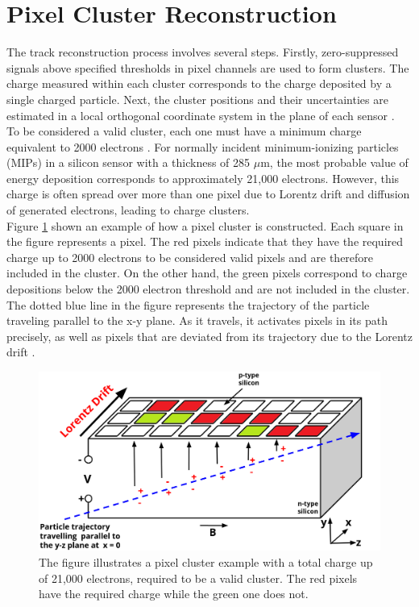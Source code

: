 \section{Pixel Cluster Reconstruction}

The track reconstruction process involves several steps. Firstly, zero-suppressed signals above specified thresholds in pixel  channels  are used to form clusters. The charge measured within each cluster corresponds to the charge deposited by a single charged particle. Next, the cluster positions and their uncertainties are estimated in a local orthogonal coordinate system  in the plane of each sensor \cite{Track_Reco_2014}. \\

To be considered a valid cluster, each one must have a minimum charge equivalent to 2000 electrons \cite{Track_Reco_2014,phase1_Pixel_Detector}. For normally incident minimum-ionizing particles (MIPs) in a silicon sensor with a thickness of 285 $\mu \text{m}$, the most probable value of energy deposition corresponds to approximately 21,000 electrons. However, this charge is often spread over more than one pixel due to Lorentz drift and diffusion of generated electrons, leading to charge clusters.\\

Figure \ref{cluster}  shown an example of how a pixel cluster is constructed. Each square in the figure represents a pixel. The red pixels indicate that they have the required charge up to 2000 electrons to be considered valid pixels and are therefore included in the cluster. On the other hand, the green pixels correspond to charge depositions below the 2000 electron threshold and are not included in the cluster.
The dotted blue line in the figure represents the trajectory of the particle traveling parallel to the x-y plane. As it travels, it activates pixels in its path precisely, as well as pixels that are deviated from its trajectory due to the Lorentz drift \cite{Pixel_Hit_Reconstruction}.\\

\newpage
\begin{center}
  \begin{figure}[h]
    \centering
    \includegraphics[scale=.25]{Chapter2/pixel_cluster.png} 
    \caption[Pixel cluster]{ The figure illustrates a pixel cluster example with a total charge up of 21,000 electrons, required to be a valid cluster. The red pixels have the required charge while the green one does not.}
    \label{cluster}
  \end{figure}
\end{center}
